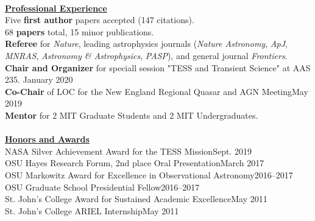 \documentclass[letterpaper,12pt]{article}
\newcommand{\award}[2]{#1\hfill#2}
\begin{document}
\\
\noindent\underline{\textbf{Professional Experience}}\\ 
 Five \textbf{first author} papers accepted (147 citations). \\
 68 \textbf{papers} total,  15 minor publications.\\ %
\textbf{Referee} for \textit{Nature}, leading astrophysics journals (\textit{Nature Astronomy}, \textit{ApJ},\\ \textit{MNRAS}, \textit{Astronomy \& Astrophysics}, \textit{PASP}), and
   general journal \textit{Frontiers}.\\%
 \textbf{Chair and Organizer} for speciall session "TESS and Transient Science" at  AAS 235. \hfill January 2020\\
  \textbf{Co-Chair} of LOC for the New England Regional Quasar and AGN Meeting\hfill May 2019\\
   \textbf{Mentor} for 2 MIT Graduate Students and 2 MIT Undergraduates.\\
\\
\noindent\underline{\textbf{Honors and Awards}}\\
\award{NASA Silver Achievement Award for the TESS Mission}{Sept. 2019}\\
\award{OSU Hayes Research Forum, 2nd place Oral Presentation}{March 2017} \\
\award{OSU Markowitz Award for Excellence in Observational Astronomy}{2016--2017}\\
\award{OSU Graduate School Presidential Fellow}{2016--2017}\\
\award{St. John's College Award for Sustained Academic Excellence}{May 2011}\\
\award{St. John's College ARIEL Internship}{May 2011}\\
\\
\end{document}
